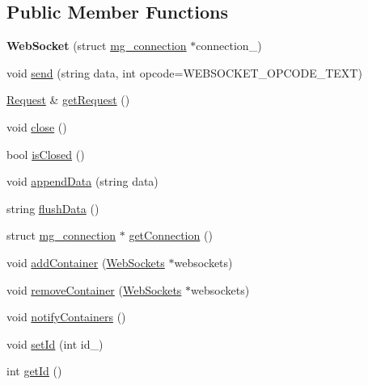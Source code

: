 \subsection*{Public Member Functions}
\begin{DoxyCompactItemize}
\item 
{\bfseries Web\+Socket} (struct \hyperlink{structmg__connection}{mg\+\_\+connection} $\ast$connection\+\_\+)\hypertarget{classMongoose_1_1WebSocket_a6562625d427018f24fc91fcb9259bcc9}{}\label{classMongoose_1_1WebSocket_a6562625d427018f24fc91fcb9259bcc9}

\item 
void \hyperlink{classMongoose_1_1WebSocket_ab96383ffe4ed7a6136ce569d7f67c5e0}{send} (string data, int opcode=W\+E\+B\+S\+O\+C\+K\+E\+T\+\_\+\+O\+P\+C\+O\+D\+E\+\_\+\+T\+E\+XT)
\item 
\hyperlink{classMongoose_1_1Request}{Request} \& \hyperlink{classMongoose_1_1WebSocket_a39139b1926aa66c8a2f28a388b7672dc}{get\+Request} ()
\item 
void \hyperlink{classMongoose_1_1WebSocket_a03d5b65c77d0b625b6a60e8d925bc827}{close} ()
\item 
bool \hyperlink{classMongoose_1_1WebSocket_a085fc0278c7774fc7a94226bdd7ff126}{is\+Closed} ()
\item 
void \hyperlink{classMongoose_1_1WebSocket_ad4358d899b522918a2ca70ead3827c28}{append\+Data} (string data)
\item 
string \hyperlink{classMongoose_1_1WebSocket_aca8ff25bc081ae419dcf91435581d4b5}{flush\+Data} ()
\item 
struct \hyperlink{structmg__connection}{mg\+\_\+connection} $\ast$ \hyperlink{classMongoose_1_1WebSocket_a922bec451249a53942b4f08ed6c0313a}{get\+Connection} ()
\item 
void \hyperlink{classMongoose_1_1WebSocket_a68bc34e82a04fe74a315c92bd59f8723}{add\+Container} (\hyperlink{classMongoose_1_1WebSockets}{Web\+Sockets} $\ast$websockets)
\item 
void \hyperlink{classMongoose_1_1WebSocket_a79ae70fca13db0624be9885e875d4ce0}{remove\+Container} (\hyperlink{classMongoose_1_1WebSockets}{Web\+Sockets} $\ast$websockets)
\item 
void \hyperlink{classMongoose_1_1WebSocket_a7b30a0149ed4534b733d39e48462d991}{notify\+Containers} ()
\item 
void \hyperlink{classMongoose_1_1WebSocket_a11ef2c71885b6c6d4edfaa443217f547}{set\+Id} (int id\+\_\+)
\item 
int \hyperlink{classMongoose_1_1WebSocket_a9b6f830cded5861a739c9bb571f69888}{get\+Id} ()
\end{DoxyCompactItemize}
